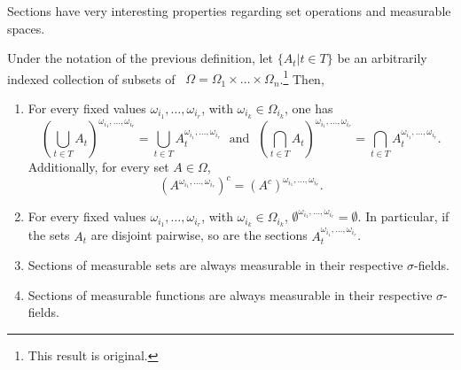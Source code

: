 Sections have very interesting properties regarding set operations and measurable spaces.

\begin{prop}\label{proposition:properties of sections}Under the notation of the previous definition, let \(\{A_t\left|t\in T\right.\}\) be an arbitrarily indexed collection of subsets of ~\(\Omega=\Omega_1\times\dots\times\Omega_n\).\footnote{This result is original.} Then,

\begin{enumerate}
    \item\label{proposition:properties of sections 1} For every fixed values \(\omega_{i_1},\dots,\omega_{i_r}\), with \(\omega_{i_k}\in\Omega_{i_k}\), one has
    \[
        \left(\bigcup_{t\in T}A_t\right)^{\omega_{i_1},\dots,\omega_{i_r}}= \bigcup_{t\in T} A_t^{\omega_{i_1},\dots,\omega_{i_r}} \text{ ~and~ }
        \left(\bigcap_{t\in T}A_t\right)^{\omega_{i_1},\dots,\omega_{i_r}}= \bigcap_{t\in T} A_t^{\omega_{i_1},\dots,\omega_{i_r}} 
    .\]
    Additionally, for every set \(A\in\Omega\),
        \[\left(A^{\omega_{i_1},\dots,\omega_{i_r}}\right)^{c}=\left(A^c\right)^{\omega_{i_1},\dots,\omega_{i_r}}.\]

    \item\label{proposition:properties of sections 2} For every fixed values \(\omega_{i_1},\dots,\omega_{i_r}\), with \(\omega_{i_k}\in\Omega_{i_k}\), \(\emptyset^{\omega_{i_1},\dots,\omega_{i_r}}=\emptyset\). In particular, if the sets \(A_t\) are disjoint pairwise, so are the sections 
    \(A_t^{\omega_{i_1},\dots,\omega_{i_r}}\).
    \item\label{proposition:properties of sections 3} Sections of measurable sets are always measurable in their respective \(\sigma\)-fields.
		\item\label{proposition:properties of sections 4} Sections of measurable functions are always measurable in their respective \(\sigma\)-fields.
\end{enumerate}
\end{prop}
